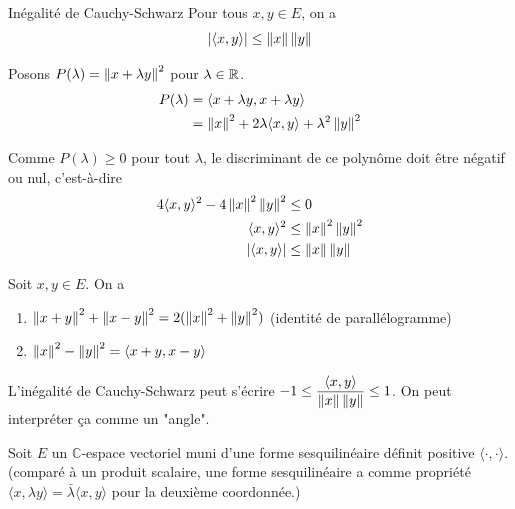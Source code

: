 \documentclass[a4paper,12pt]{article}
\begin{document}
\begin{theoreme}{Inégalité de Cauchy-Schwarz}
    Pour tous $x, y \in E$, on a
    $$    
    |\langle x, y \rangle| \leq \left\lVert x\right\rVert \left\lVert y\right\rVert
    $$
\end{theoreme}

\begin{demonstration}
    Posons $P(\lambda) = \left\lVert x + \lambda y\right\rVert^2$ pour $\lambda \in \mathbb{R}$.
    \begin{align*}
        P(\lambda) &= \langle x + \lambda y, x + \lambda y \rangle \\
        &= \left\lVert x\right\rVert^2 + 2\lambda \langle x, y \rangle + \lambda^2 \left\lVert y\right\rVert^2
    \end{align*}

    Comme $P(\lambda) \geq 0$ pour tout $\lambda$, le discriminant de ce polynôme doit être négatif ou nul, c'est-à-dire
    \begin{align*}
        4 \langle x, y \rangle^2 - 4 \left\lVert x\right\rVert^2 \left\lVert y\right\rVert^2 &\leq 0 \\
        \langle x, y \rangle^2 &\leq \left\lVert x\right\rVert^2 \left\lVert y\right\rVert^2 \\
        |\langle x, y \rangle| &\leq \left\lVert x\right\rVert \left\lVert y\right\rVert
    \end{align*}
\end{demonstration}

\begin{theoreme}{}{}
    Soit $x, y \in E$. On a
    \begin{enumerate}
        \item $\left\lVert x + y\right\rVert^2 + \left\lVert x - y\right\rVert^2 = 2(\left\lVert x\right\rVert^2 + \left\lVert y\right\rVert^2)$ (identité de parallélogramme)
        \item $\left\lVert x\right\rVert^2 - \left\lVert y\right\rVert^2 = \langle x + y, x - y \rangle$
    \end{enumerate}
\end{theoreme}

\begin{remarque}
    L'inégalité de Cauchy-Schwarz peut s'écrire $-1 \leq \dfrac{\langle x, y \rangle}{\left\lVert x\right\rVert \left\lVert y\right\rVert} \leq 1$.
    On peut interpréter ça comme un "angle".
\end{remarque}

\begin{remarque}
    Soit $E$ un $\mathbb{C}$-espace vectoriel muni d'une forme sesquilinéaire définit positive $\langle \cdot, \cdot \rangle$.
    (comparé à un produit scalaire, une forme sesquilinéaire a comme propriété $\langle x, \lambda y \rangle = \bar{\lambda} \langle x, y \rangle$ pour la deuxième coordonnée.)
\end{remarque}
\end{document}
